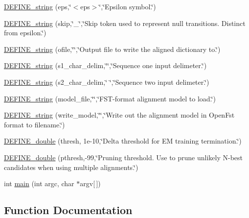 \begin{DoxyCompactItemize}
\item 
\hyperlink{phonetisaurus-align_8cc_ae1595814a6ef0dc3ac1d18c60dac9769}{D\+E\+F\+I\+N\+E\+\_\+string} (eps,\char`\"{}$<$eps$>$\char`\"{},\char`\"{}Epsilon symbol.\char`\"{})
\item 
\hyperlink{phonetisaurus-align_8cc_a1a6e906e949b6845ef8a186dd0055335}{D\+E\+F\+I\+N\+E\+\_\+string} (skip,\char`\"{}\+\_\+\char`\"{},\char`\"{}Skip token used to represent null transitions.  Distinct from epsilon.\char`\"{})
\item 
\hyperlink{phonetisaurus-align_8cc_a07d2fe8a6f9c92439d4b8d5d016615c6}{D\+E\+F\+I\+N\+E\+\_\+string} (ofile,\char`\"{}\char`\"{},\char`\"{}Output file to write the aligned dictionary to.\char`\"{})
\item 
\hyperlink{phonetisaurus-align_8cc_abd54ad579a1f0f7eb6d56be80ac789c7}{D\+E\+F\+I\+N\+E\+\_\+string} (s1\+\_\+char\+\_\+delim,\char`\"{}\char`\"{},\char`\"{}Sequence one input delimeter.\char`\"{})
\item 
\hyperlink{phonetisaurus-align_8cc_ab639bd94e4ccb405b69a82d6efba7d45}{D\+E\+F\+I\+N\+E\+\_\+string} (s2\+\_\+char\+\_\+delim,\char`\"{} \char`\"{},\char`\"{}Sequence two input delimeter.\char`\"{})
\item 
\hyperlink{phonetisaurus-align_8cc_a7ecda1625cd9a67bd26bc048506fbd75}{D\+E\+F\+I\+N\+E\+\_\+string} (model\+\_\+file,\char`\"{}\char`\"{},\char`\"{}F\+ST-\/format alignment model to load.\char`\"{})
\item 
\hyperlink{phonetisaurus-align_8cc_a96fba0f3561a62e7a839e057a142c492}{D\+E\+F\+I\+N\+E\+\_\+string} (write\+\_\+model,\char`\"{}\char`\"{},\char`\"{}Write out the alignment model in Open\+Fst format to filename.\char`\"{})
\item 
\hyperlink{phonetisaurus-align_8cc_a8c2a80c854a2595c7326a8cdec4147f0}{D\+E\+F\+I\+N\+E\+\_\+double} (thresh, 1e-\/10,\char`\"{}\+Delta threshold for E\+M training termination.\char`\"{})
\item 
\hyperlink{phonetisaurus-align_8cc_aeba2f6623326254ef340dfc611835b26}{D\+E\+F\+I\+N\+E\+\_\+double} (pthresh,-\/99,\char`\"{}Pruning threshold.  Use to prune unlikely N-\/best candidates when using multiple alignments.\char`\"{})
\item 
int \hyperlink{phonetisaurus-align_8cc_a0ddf1224851353fc92bfbff6f499fa97}{main} (int argc, char $\ast$argv\mbox{[}$\,$\mbox{]})
\end{DoxyCompactItemize}


\subsection{Function Documentation}
